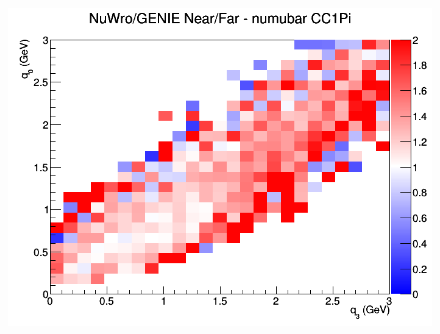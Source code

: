 \begin{figure}[h]
\endminipage
{}
\includegraphics[width=\linewidth]{eff_q0_q3/FGT/ratios/CC1Pi_NuWro_GENIE_numubar_NF_q3_q0.png}
\endminipage
\newline
\end{figure}
\clearpage
